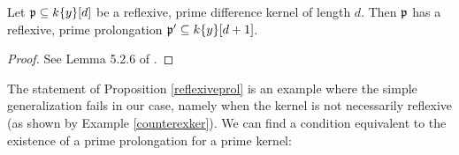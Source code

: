 \begin{prop}\label{reflexiveprol}
Let $\mathfrak{p} \subseteq k\{y\}[d]$ be a reflexive, prime difference kernel of length $d$. Then $\mathfrak{p}$ has a reflexive, prime prolongation $\mathfrak{p}' \subseteq k\{y\}[d+1]$.
\begin{proof}
See Lemma 5.2.6 of \cite{wibmer}.
\end{proof}
\end{prop}

The statement of Proposition \ref{reflexiveprol} is an example where the simple generalization fails in our case, namely when the kernel is not necessarily reflexive (as shown by Example \ref{counterexker}). We can find a condition equivalent to the existence of a prime prolongation for a prime kernel:


